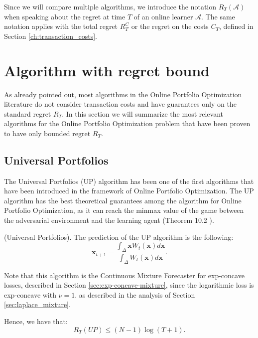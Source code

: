 Since we will compare multiple algorithms, we introduce the notation $R_T(\mathcal A)$ when speaking about the regret at time $T$ of an online learner $\mathcal A$. The same notation applies with the total regret $R_T^C$ or the regret on the costs $C_T$, defined in Section \ref{ch:transaction_costs}.

\section{Algorithm with regret bound}

As already pointed out, most algorithms in the Online Portfolio Optimization literature do not consider transaction costs and have guarantees only on the standard regret $R_T$. In this section we will summarize the most relevant algorithms for the Online Portfolio Optimization problem that have been proven to have only bounded regret $R_T$. 

\subsection{Universal Portfolios}\label{sec:UP}
The Universal Portfolios (UP) \cite{cover1996universal} algorithm has been one of the first algorithms that have been introduced in the framework of Online Portfolio Optimization. The UP algorithm has the best theoretical guarantees among the algorithm for Online Portfolio Optimization, as it can reach the minmax value of the game between the adversarial environment and the learning agent (Theorem 10.2 \cite{cesa2006prediction}).


\begin{definition}(Universal Portfolios).
The prediction of the UP algorithm is the following:
\begin{equation}\label{eq:UP}
\mathbf x_{t+1}=\frac{\int_{\Delta}\mathbf x W_t(\mathbf x)d\mathbf x}{\int_{\Delta} W_t(\mathbf x)d\mathbf x}.
\end{equation}
\end{definition}

Note that this algorithm is the Continuous Mixture Forecaster for exp-concave losses, described in Section \ref{sec:exp-concave-mixture}, since the logarithmic loss is exp-concave with $\nu=1$. as described in the analysis of Section \ref{sec:laplace_mixture}.

Hence, we have that: 
\begin{equation}
R_T(UP)\le(N-1)\log(T+1).
\end{equation}

